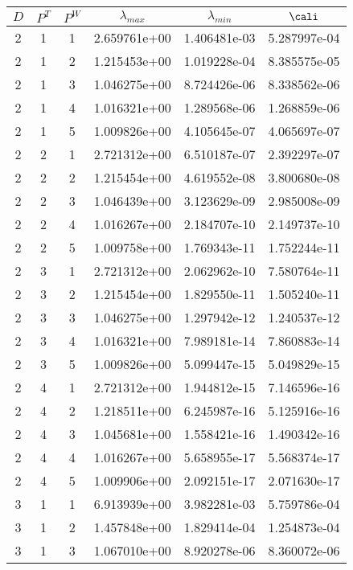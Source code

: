 \documentclass{article}
\begin{document}
{\begin{small}
\begin{table}
\begin{center}
\begin{tabular}{|ccc|ccc|} \hline
 $D$ & $P^T$  & $P^W$  & $\lambda_{max}$ & $\lambda_{min}$   & $\cali$  \\
\hline
2 & 1 & 1 &  2.659761e+00 & 1.406481e-03 & 5.287997e-04 \\ 
2 & 1 & 2 &  1.215453e+00 & 1.019228e-04 & 8.385575e-05 \\ 
2 & 1 & 3 &  1.046275e+00 & 8.724426e-06 & 8.338562e-06 \\ 
2 & 1 & 4 &  1.016321e+00 & 1.289568e-06 & 1.268859e-06 \\ 
2 & 1 & 5 &  1.009826e+00 & 4.105645e-07 & 4.065697e-07 \\ 
2 & 2 & 1 &  2.721312e+00 & 6.510187e-07 & 2.392297e-07 \\ 
2 & 2 & 2 &  1.215454e+00 & 4.619552e-08 & 3.800680e-08 \\ 
2 & 2 & 3 &  1.046439e+00 & 3.123629e-09 & 2.985008e-09 \\ 
2 & 2 & 4 &  1.016267e+00 & 2.184707e-10 & 2.149737e-10 \\ 
2 & 2 & 5 &  1.009758e+00 & 1.769343e-11 & 1.752244e-11 \\ 
2 & 3 & 1 &  2.721312e+00 & 2.062962e-10 & 7.580764e-11 \\ 
2 & 3 & 2 &  1.215454e+00 & 1.829550e-11 & 1.505240e-11 \\ 
2 & 3 & 3 &  1.046275e+00 & 1.297942e-12 & 1.240537e-12 \\ 
2 & 3 & 4 &  1.016321e+00 & 7.989181e-14 & 7.860883e-14 \\ 
2 & 3 & 5 &  1.009826e+00 & 5.099447e-15 & 5.049829e-15 \\ 
2 & 4 & 1 &  2.721312e+00 & 1.944812e-15 & 7.146596e-16 \\ 
2 & 4 & 2 &  1.218511e+00 & 6.245987e-16 & 5.125916e-16 \\ 
2 & 4 & 3 &  1.045681e+00 & 1.558421e-16 & 1.490342e-16 \\ 
2 & 4 & 4 &  1.016267e+00 & 5.658955e-17 & 5.568374e-17 \\ 
2 & 4 & 5 &  1.009906e+00 & 2.092151e-17 & 2.071630e-17 \\ 
\hline
3 & 1 & 1 & 6.913939e+00 & 3.982281e-03 & 5.759786e-04 \\ 
3 & 1 & 2 & 1.457848e+00 & 1.829414e-04 & 1.254873e-04 \\ 
3 & 1 & 3 & 1.067010e+00 & 8.920278e-06 & 8.360072e-06 \\ 

\end{tabular}
\end{center}
\end{table}
\end{small}}
\end{document}

